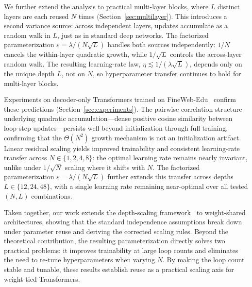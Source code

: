We further extend the analysis to practical multi-layer blocks, where $L$ distinct layers are each reused $N$ times (Section~\ref{sec:multilayer}).
This introduces a second variance source: across independent layers, updates accumulate as a random walk in $L$, just as in standard deep networks.
The factorized parameterization $\varepsilon = \lambda/(N\sqrt{L})$ handles both sources independently: $1/N$ cancels the within-layer quadratic growth, while $1/\!\sqrt{L}$ controls the across-layer random walk.
The resulting learning-rate law, $\eta \lesssim 1/(\lambda\sqrt{L})$, depends only on the unique depth $L$, not on $N$, so hyperparameter transfer continues to hold for multi-layer blocks.

Experiments on decoder-only Transformers trained on FineWeb-Edu~\citep{penedo2024fineweb} confirm these predictions (Section~\ref{sec:experiments}).
The pairwise correlation structure underlying quadratic accumulation---dense positive cosine similarity between loop-step updates---persists well beyond initialization through full training, confirming that the $\Theta(N^2)$ growth mechanism is not an initialization artifact.
Linear residual scaling yields improved trainability and consistent learning-rate transfer across $N\in\{1,2,4,8\}$: the optimal learning rate remains nearly invariant, unlike under $1/\!\sqrt{N}$ scaling where it shifts with $N$.
The factorized parameterization $\varepsilon=\lambda/(N\sqrt{L})$ further extends this transfer across depths $L\in\{12,24,48\}$, with a single learning rate remaining near-optimal over all tested $(N,L)$ combinations.

Taken together, our work extends the depth-scaling framework~\citep{yang2022tensorprogramsV,dey2025completep} to weight-shared architectures, showing that the standard independence assumptions break down under parameter reuse and deriving the corrected scaling rules.
Beyond the theoretical contribution, the resulting parameterization directly solves two practical problems: it improves trainability at large loop counts and eliminates the need to re-tune hyperparameters when varying $N$.
By making the loop count stable and tunable, these results establish reuse as a practical scaling axis for weight-tied Transformers.
